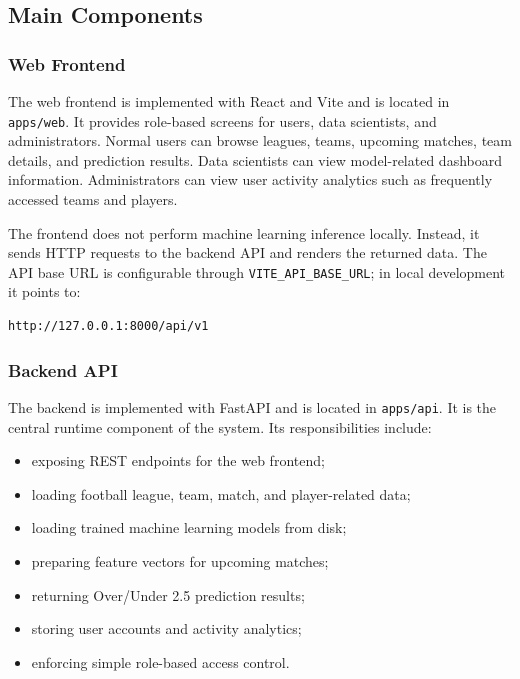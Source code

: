 \subsection{Main Components}
\label{subsec:main-components}

\subsubsection{Web Frontend}

The web frontend is implemented with React and Vite and is located in \texttt{apps/web}. It provides role-based screens for users, data scientists, and administrators. Normal users can browse leagues, teams, upcoming matches, team details, and prediction results. Data scientists can view model-related dashboard information. Administrators can view user activity analytics such as frequently accessed teams and players.

The frontend does not perform machine learning inference locally. Instead, it sends HTTP requests to the backend API and renders the returned data. The API base URL is configurable through \texttt{VITE\_API\_BASE\_URL}; in local development it points to:

\begin{verbatim}
http://127.0.0.1:8000/api/v1
\end{verbatim}

\subsubsection{Backend API}

The backend is implemented with FastAPI and is located in \texttt{apps/api}. It is the central runtime component of the system. Its responsibilities include:

\begin{itemize}
    \item exposing REST endpoints for the web frontend;
    \item loading football league, team, match, and player-related data;
    \item loading trained machine learning models from disk;
    \item preparing feature vectors for upcoming matches;
    \item returning Over/Under 2.5 prediction results;
    \item storing user accounts and activity analytics;
    \item enforcing simple role-based access control.
\end{itemize}

